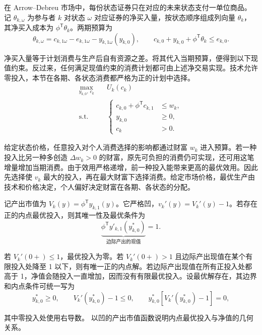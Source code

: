 在 Arrow--Debreu 市场中，每份状态证券只在对应的未来状态支付一单位商品。记 $\theta_{k,\omega}$ 为参与者 $k$ 对状态 $\omega$ 对应证券的净买入量，按状态顺序组成列向量 $\theta_k$，其净买入成本为 $\phi^{\mathsf T}\theta_k$。两期预算为
\[
 \theta_{k,\omega}=c_{k,1\omega}-e_{k,1\omega}
                   -y_{k,1\omega}(y_{k,0}),\qquad
 c_{k,0}+y_{k,0}+\phi^{\mathsf T}\theta_k\le e_{k,0}.
\]

净买入量等于计划消费与生产后自有资源之差。将其代入当期预算，便得到以下现值约束。反过来，任何满足现值约束的消费计划都可由上述净交易实现。技术允许零投入，本节在各期、各状态消费都严格为正的计划中选择。
\begin{equation}
 \begin{aligned}
 \max_{y_{k,0},\,c_k}\quad &U_k(c_k)\\
 \text{s.t.}\quad &
 \left\{\begin{aligned}
 c_{k,0}+\phi^{\mathsf T}c_{k,1}&\le w_k,\\
 y_{k,0}&\ge0,\\
 c_k&>0.
 \end{aligned}\right.
 \end{aligned}
 \label{eq:wj-15-4}
\end{equation}

给定状态价格，任意投入对个人消费选择的影响都通过财富 $w_k$ 进入预算。若一种投入比另一种多创造 $\Delta w_k>0$ 的财富，原先可负担的消费仍可实现，还可用这笔增量增加当期消费。由于效用严格递增，前一种投入能带来更高的最优效用。因此先选择使 $v_k$ 最大的投入，再在最大财富下选择消费。给定市场价格，最优生产由技术和价格决定，个人偏好决定财富在各期、各状态的分配。

记产出市值为 $V_k(y)=\phi^{\mathsf T}y_{k,1}(y)$。它严格凹，$v_k'(y)=V_k'(y)-1$。若存在正的内点最优投入，则其唯一性及最优条件为
\begin{equation}
 \underbrace{\phi^{\mathsf T}y'_{k,1}(y_{k,0}^*)}_{\text{边际产出的现值}}=1.
 \label{eq:wj-15-5}
\end{equation}

若 $V_k'(0+)\le1$，最优投入为零。若 $V_k'(0+)>1$ 且边际产出现值在某个有限投入处降至 1 以下，则有唯一正的内点解。若边际产出现值在所有正投入处都高于 1，净值会随投入一直增加，因而没有有限最优投入。设最优解存在，其边界和内点条件可统一写为
\[
 y_{k,0}^*\ge0,\qquad V_k'(y_{k,0}^*)-1\le0,\qquad
 y_{k,0}^*[V_k'(y_{k,0}^*)-1]=0,
\]

其中零投入处使用右导数。
 以凹的产出市值函数说明内点最优投入与净值的几何关系。


